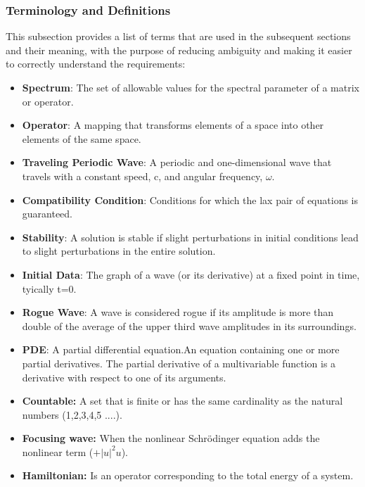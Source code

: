 \documentclass[12pt]{article}
\begin{document}
\subsubsection{Terminology and  Definitions}

This subsection provides a list of terms that are used in the subsequent
sections and their meaning, with the purpose of reducing ambiguity and making it
easier to correctly understand the requirements:

\begin{itemize}

\item \textbf{Spectrum}: The set of allowable values for the spectral parameter 
of a matrix or operator.
\item \textbf{Operator}: A mapping that transforms elements of a space into 
other elements of the same space. 
\item \textbf{Traveling Periodic Wave}: A periodic and one-dimensional wave 
that travels with a constant speed, c, and angular frequency, $\omega$. 
\item \textbf{Compatibility Condition}: Conditions for which the lax pair of 
equations is guaranteed. 
\item \textbf{Stability}: A solution is stable if slight perturbations in 
initial conditions lead 
to slight perturbations in the entire solution.
\item \textbf{Initial Data}: The graph of a wave (or its derivative) 
at a fixed point in time, tyically t=0.
\item \textbf{Rogue Wave}: A wave is considered rogue if its amplitude is more 
than double of the average of the upper third wave amplitudes in its 
surroundings. 
\item \textbf{PDE}: A partial differential equation.An equation containing one 
or more partial derivatives. The partial derivative of a multivariable function 
is a derivative with respect to one of its arguments. 
\item \textbf{Countable:} A set that is finite or has the same cardinality as 
the natural numbers (1,2,3,4,5 ....). 
\item \textbf{Focusing wave:} When the nonlinear Schr\"{o}dinger equation adds 
the 
nonlinear term ($+|u|^{2}u$).  
\item \textbf{Hamiltonian:} Is an operator corresponding to the total energy of 
a system. 

\end{itemize}
\end{document}
